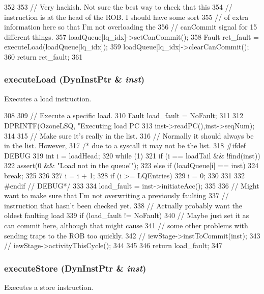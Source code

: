 \begin{DoxyCode}
352 {
353     // Very hackish.  Not sure the best way to check that this
354     // instruction is at the head of the ROB.  I should have some sort
355     // of extra information here so that I'm not overloading the
356     // canCommit signal for 15 different things.
357     loadQueue[lq_idx]->setCanCommit();
358     Fault ret_fault = executeLoad(loadQueue[lq_idx]);
359     loadQueue[lq_idx]->clearCanCommit();
360     return ret_fault;
361 }
\end{DoxyCode}
\hypertarget{classOzoneLSQ_a30c6332142c2ecca389ed6ee463c692b}{
\subsubsection[{executeLoad}]{ executeLoad ({\bf DynInstPtr} \& {\em inst})}}
\label{classOzoneLSQ_a30c6332142c2ecca389ed6ee463c692b}
Executes a load instruction. 


\begin{DoxyCode}
308 {
309     // Execute a specific load.
310     Fault load_fault = NoFault;
311 
312     DPRINTF(OzoneLSQ, "Executing load PC %
313             inst->readPC(),inst->seqNum);
314 
315     // Make sure it's really in the list.
316     // Normally it should always be in the list.  However,
317     /* due to a syscall it may not be the list.
318 #ifdef DEBUG
319     int i = loadHead;
320     while (1) {
321         if (i == loadTail && !find(inst)) {
322             assert(0 && "Load not in the queue!");
323         } else if (loadQueue[i] == inst) {
324             break;
325         }
326 
327         i = i + 1;
328         if (i >= LQEntries) {
329             i = 0;
330         }
331     }
332 #endif // DEBUG*/
333 
334     load_fault = inst->initiateAcc();
335 
336     // Might want to make sure that I'm not overwriting a previously faulting
337     // instruction that hasn't been checked yet.
338     // Actually probably want the oldest faulting load
339     if (load_fault != NoFault) {
340         // Maybe just set it as can commit here, although that might cause
341         // some other problems with sending traps to the ROB too quickly.
342 //        iewStage->instToCommit(inst);
343 //        iewStage->activityThisCycle();
344     }
345 
346     return load_fault;
347 }
\end{DoxyCode}
\hypertarget{classOzoneLSQ_aad78b8a37ee5c61e47df58dd39980340}{
\subsubsection[{executeStore}]{ executeStore ({\bf DynInstPtr} \& {\em inst})}}
\label{classOzoneLSQ_aad78b8a37ee5c61e47df58dd39980340}
Executes a store instruction. 


